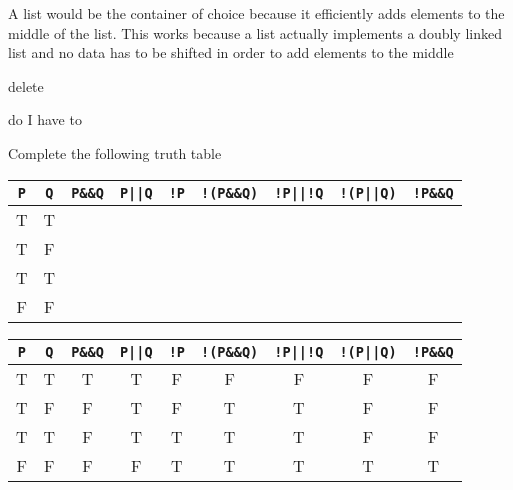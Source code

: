 \documentclass[10pt,addpoints]{exam}
\begin{document}
\begin{questions}
\begin{minipage}{\linewidth}
\begin{solutionbox}{3in}

A list would be the container of choice because it efficiently adds elements
to the middle of the list. This works because a list actually implements a
doubly linked list and no data has to be shifted in order to add elements to
the middle

\end{solutionbox}
\end{minipage}


\par\vspace{0.100000in}\begin{minipage}{\linewidth}
\question[20]
delete
\begin{solutionbox}{3in}
do I have to
\end{solutionbox}
\end{minipage}


\par\vspace{0.100000in}\begin{minipage}{\linewidth}
\question[14]

Complete the following truth table
\begin{center}
\begin{tabular}{ | c | c | c | c | c | c | c | c | c |}
\hline

\verb#P#&\verb#Q#&\verb#P&&Q#&\verb#P||Q#&\verb#!P#&
\verb#!(P&&Q)#&\verb#!P||!Q#&\verb#!(P||Q)#&\verb#!P&&Q# \\ \hline
T&T& & & & & & &  \\ \hline
T&F& & & & & & &  \\ \hline
T&T& & & & & & &  \\ \hline
F&F& & & & & & &  \\ \hline
\end{tabular}
\end{center}

\begin{solutionbox}{0in}

\begin{center}
\begin{tabular}{ | c | c | c | c | c | c | c | c | c |}
\hline
\verb#P#&\verb#Q#&\verb#P&&Q#&\verb#P||Q#&\verb#!P#&
\verb#!(P&&Q)#&\verb#!P||!Q#&\verb#!(P||Q)#&\verb#!P&&Q# \\ \hline
T&T&T&T&F&F&F&F&F \\ \hline
T&F&F&T&F&T&T&F&F \\ \hline
T&T&F&T&T&T&T&F&F \\ \hline
F&F&F&F&T&T&T&T&T \\ \hline
\end{tabular}
\end{center}


\end{solutionbox}
\end{minipage}
\end{questions}
\end{document}

